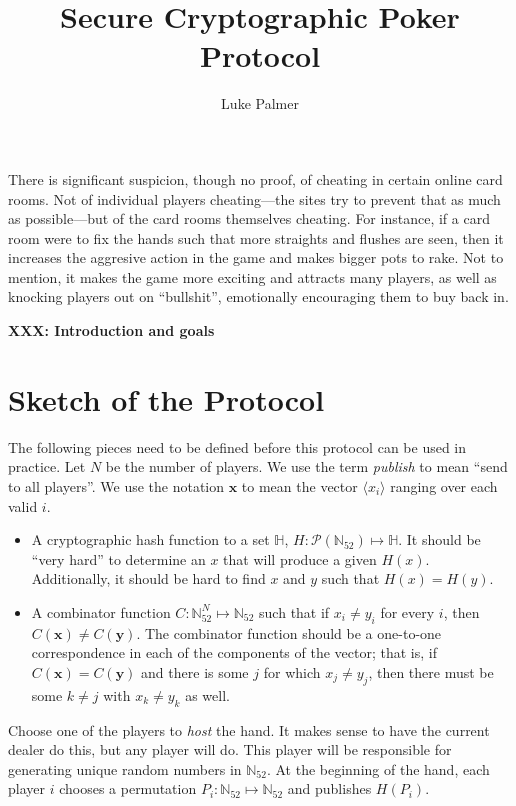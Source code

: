 \documentclass[12pt]{article}
\title{Secure Cryptographic Poker Protocol}
\author{Luke Palmer}
\newcommand{\XXX}[1]{\textbf{XXX: #1}}
\newcommand{\carddom}{\mathbb{N}_{52}}
\begin{document}
\maketitle

There is significant suspicion, though no proof, of cheating in certain
online card rooms.  Not of individual players cheating---the sites try
to prevent that as much as possible---but of the card rooms themselves
cheating.  For instance, if a card room were to fix the hands such that
more straights and flushes are seen, then it increases the aggresive
action in the game and makes bigger pots to rake.  Not to mention, it
makes the game more exciting and attracts many players, as well as
knocking players out on ``bullshit'', emotionally encouraging them to
buy back in.

\XXX{Introduction and goals}

\section{Sketch of the Protocol}

The following pieces need to be defined before this protocol can be used
in practice.  Let $N$ be the number of players.  We use the term
\textit{publish} to mean ``send to all players''.  We use the notation
$\mathbf{x}$ to mean the vector $\langle x_i \rangle$ ranging over each
valid $i$.

\begin{itemize}
\item A cryptographic hash function to a set $\mathbb{H}$, $H:
\mathcal{P}(\carddom) \mapsto \mathbb{H}$.  It should be  ``very hard''
to determine an $x$ that will produce a given $H(x)$.  Additionally, it
should be hard to find $x$ and $y$ such that $H(x) = H(y)$.
\item A combinator function $C: \carddom^N \mapsto \carddom$ such that
if $x_i \not= y_i$ for every $i$, then $C(\mathbf{x}) \not=
C(\mathbf{y})$.  The combinator function should be a one-to-one
correspondence in each of the components of the vector; that is, if
$C(\mathbf{x}) = C(\mathbf{y})$ and there is some $j$ for which $x_j
\not= y_j$, then there must be some $k \not= j$ with $x_k \not= y_k$ as
well.
\end{itemize}

Choose one of the players to \textit{host} the hand.  It makes sense to
have the current dealer do this, but any player will do.  This player
will be responsible for generating unique random numbers in $\carddom$.
At the beginning of the hand, each player $i$ chooses a permutation
$P_i: \carddom \mapsto \carddom$ and publishes $H(P_i)$.  
\end{document}
